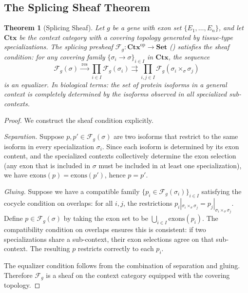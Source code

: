 \documentclass[12pt,a4paper]{article}
\newtheorem{theorem}{Theorem}[section]
\theoremstyle{definition}
\newcommand{\cat}[1]{\mathbf{#1}}
\begin{document}
\subsection{The Splicing Sheaf Theorem}

\begin{theorem}[Splicing Sheaf]\label{thm:splicing-sheaf}
Let $g$ be a gene with exon set $\{E_1, \ldots, E_n\}$, and let $\cat{Ctx}$ be the context category with a covering topology generated by tissue-type specializations. The splicing presheaf $\mathcal{F}_g \colon \cat{Ctx}^{\mathrm{op}} \to \cat{Set}$ () satisfies the sheaf condition: for any covering family $\{\sigma_i \to \sigma\}_{i \in I}$ in $\cat{Ctx}$, the sequence
\[
  \mathcal{F}_g(\sigma) \xrightarrow{\;\mathrm{res}\;}
  \prod_{i \in I} \mathcal{F}_g(\sigma_i)
  \rightrightarrows
  \prod_{i,j \in I} \mathcal{F}_g(\sigma_i \times_\sigma \sigma_j)
\]
is an equalizer. In biological terms: the set of protein isoforms in a general context is completely determined by the isoforms observed in all specialized sub-contexts.
\end{theorem}

\begin{proof}
We construct the sheaf condition explicitly.

\emph{Separation.} Suppose $p, p' \in \mathcal{F}_g(\sigma)$ are two isoforms that restrict to the same isoform in every specialization $\sigma_i$. Since each isoform is determined by its exon content, and the specialized contexts collectively determine the exon selection (any exon that is included in $\sigma$ must be included in at least one specialization), we have $\mathrm{exons}(p) = \mathrm{exons}(p')$, hence $p = p'$.

\emph{Gluing.} Suppose we have a compatible family $\{p_i \in \mathcal{F}_g(\sigma_i)\}_{i \in I}$ satisfying the cocycle condition on overlaps: for all $i, j$, the restrictions $p_i|_{\sigma_i \times_\sigma \sigma_j} = p_j|_{\sigma_i \times_\sigma \sigma_j}$. Define $p \in \mathcal{F}_g(\sigma)$ by taking the exon set to be $\bigcup_{i \in I} \mathrm{exons}(p_i)$. The compatibility condition on overlaps ensures this is consistent: if two specializations share a sub-context, their exon selections agree on that sub-context. The resulting $p$ restricts correctly to each $p_i$.

The equalizer condition follows from the combination of separation and gluing. Therefore $\mathcal{F}_g$ is a sheaf on the context category equipped with the covering topology.
\end{proof}
\end{document}
